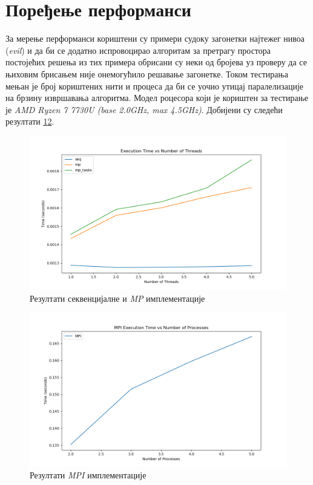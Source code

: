 \section{Поређење перформанси}
За мерење перформанси кориштени су примери судоку загонетки најтежег нивоа (\textit{evil}) и да би се додатно испровоцирао алгоритам за претрагу простора постојећих решења из тих примера обрисани су неки од бројева уз проверу да се њиховим брисањем није онемогућило решавање загонетке. Током тестирања мењан је број кориштених нити и процеса да би се уочио утицај паралелизације на брзину извршавања алгоритма. Модел роцесора који је кориштен за тестирање је \textit{AMD Ryzen 7 7730U (base 2.0GHz, max 4.5GHz)}. Добијени су следећи резултати \ref{fig:seq_mp_results}\ref{fig:mpi_results}.

\begin{figure}[H]
    \centering
    \includegraphics[width=1\textwidth]{images/graph_1.png}
    \caption{Резултати секвенцијалне и \textit{MP} имплементације}
    \label{fig:seq_mp_results}
\end{figure}

\begin{figure}[H]
    \centering
    \includegraphics[width=1\textwidth]{images/graph_2.png}
    \caption{Резултати \textit{MPI} имплементације}
    \label{fig:mpi_results}
\end{figure}

